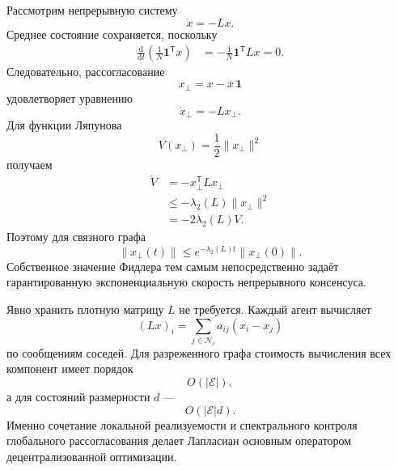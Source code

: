Рассмотрим непрерывную систему
\[
    \dot x=-Lx.
\]
Среднее состояние сохраняется, поскольку
\[
\begin{aligned}
    \frac{\mathrm d}{\mathrm dt}
    \left(
        \frac1N\mathbf1^{\mathsf T}x
    \right)
    &=
    -\frac1N\mathbf1^{\mathsf T}Lx
    =
    0.
\end{aligned}
\]
Следовательно, рассогласование
\[
    x_\perp=x-\overline x\,\mathbf1
\]
удовлетворяет уравнению
\[
    \dot x_\perp=-Lx_\perp.
\]
Для функции Ляпунова
\[
    V(x_\perp)
    =
    \frac12\lVert x_\perp\rVert^2
\]
получаем
\[
\begin{aligned}
    \dot V
    &=
    -x_\perp^{\mathsf T}Lx_\perp
    \\
    &\le
    -\lambda_2(L)
    \lVert x_\perp\rVert^2
    \\
    &=
    -2\lambda_2(L)V.
\end{aligned}
\]
Поэтому для связного графа
\[
    \lVert x_\perp(t)\rVert
    \le
    e^{-\lambda_2(L)t}
    \lVert x_\perp(0)\rVert.
\]
Собственное значение Фидлера тем самым непосредственно задаёт
гарантированную экспоненциальную скорость непрерывного консенсуса.

Явно хранить плотную матрицу \(L\) не требуется. Каждый агент
вычисляет
\[
    (Lx)_i
    =
    \sum_{j\in\mathcal N_i}
    a_{ij}(x_i-x_j)
\]
по сообщениям соседей. Для разреженного графа стоимость вычисления
всех компонент имеет порядок
\[
    O(\lvert\mathcal E\rvert),
\]
а для состояний размерности \(d\) ---
\[
    O(\lvert\mathcal E\rvert d).
\]
Именно сочетание локальной реализуемости и спектрального контроля
глобального рассогласования делает Лапласиан основным оператором
децентрализованной оптимизации.
